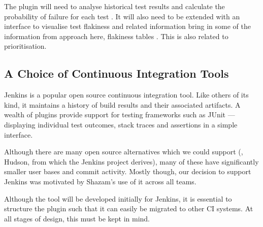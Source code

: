 The plugin will need to analyse historical test results and calculate the probability of failure for each test . It will also need to be extended with an interface to visualise test flakiness and related information {\todo bring in some of the information from approach here, flakiness tables \etc}. This is also related to prioritisation.


\subsection{A Choice of Continuous Integration Tools}

Jenkins \cite{Jenkins} is a popular open source continuous integration tool. Like others of its kind, it maintains a history of build results and their associated artifacts. A wealth of plugins provide support for testing frameworks such as JUnit --- displaying individual test outcomes, stack traces and assertions in a simple interface.

Although there are many open source alternatives which we could support (\eg, Hudson, from which the Jenkins project derives), many of these have significantly smaller user bases and commit activity. Mostly though, our decision to support Jenkins was motivated by Shazam's use of it across all teams.

Although the tool will be developed initially for Jenkins, it is essential to structure the plugin such that it can easily be migrated to other CI systems. At all stages of design, this must be kept in mind.